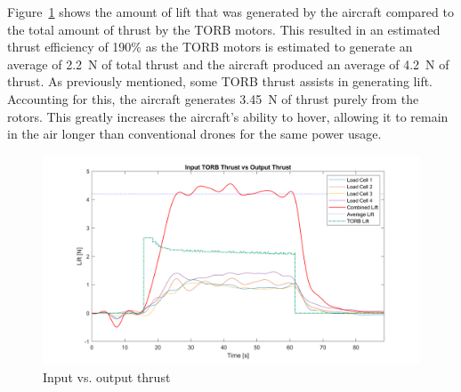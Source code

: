         Figure~\ref{fig: efficiency} shows the amount of lift that was generated by the aircraft compared to the total amount of thrust by the TORB motors. This resulted in an estimated thrust efficiency of 190\% as the TORB motors is estimated to generate an average of 2.2~N of total thrust and the aircraft produced an average of  4.2~N of thrust. As previously mentioned, some TORB thrust assists in generating lift. Accounting for this, the aircraft generates 3.45~N of thrust purely from the rotors. This greatly increases the aircraft's ability to hover, allowing it to remain in the air longer than conventional drones for the same power usage.

            \begin{figure}[H]
                \centering
                \includegraphics*[width =\textwidth]{figs/Data_Analysis/Lift Generated-PWM 120.png}
                \caption{Input vs. output thrust}
                \label{fig: efficiency}
            \end{figure} 

